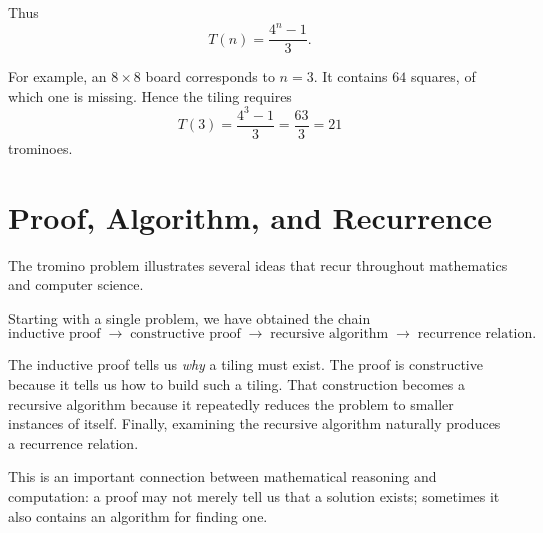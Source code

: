 \documentclass[12pt]{article}
\begin{document}
Thus
\[
        \boxed{T(n)=\frac{4^n-1}{3}}.
\]

For example, an $8\times8$ board corresponds to $n=3$. It contains
$64$ squares, of which one is missing. Hence the tiling requires
\[
        T(3)=\frac{4^3-1}{3}
             =\frac{63}{3}
             =21
\]
trominoes.


\section{Proof, Algorithm, and Recurrence}

The tromino problem illustrates several ideas that recur throughout
mathematics and computer science.

Starting with a single problem, we have obtained the chain
\[
\boxed{
\text{inductive proof}
\;\longrightarrow\;
\text{constructive proof}
\;\longrightarrow\;
\text{recursive algorithm}
\;\longrightarrow\;
\text{recurrence relation}.
}
\]

The inductive proof tells us \emph{why} a tiling must exist. The proof
is constructive because it tells us how to build such a tiling. That
construction becomes a recursive algorithm because it repeatedly
reduces the problem to smaller instances of itself. Finally, examining
the recursive algorithm naturally produces a recurrence relation.

This is an important connection between mathematical reasoning and
computation: a proof may not merely tell us that a solution exists;
sometimes it also contains an algorithm for finding one.
\end{document}

